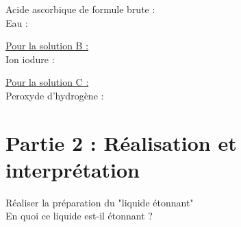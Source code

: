 \documentclass[a4paper,12pt,fleqn]{article}%
\begin{document}
Acide ascorbique de formule brute  :\\

\vspace{3cm}
Eau :

\vspace{3cm}

\underline{Pour la solution B :}\\

Ion iodure  :

\vspace{3cm}

\underline{Pour la solution C :}\\
Peroxyde d'hydrogène  :
\vspace{3cm}

\section*{Partie 2 : Réalisation et interprétation}
Réaliser la préparation du "liquide étonnant"\\
En quoi ce liquide est-il étonnant ?

	
\end{document}
